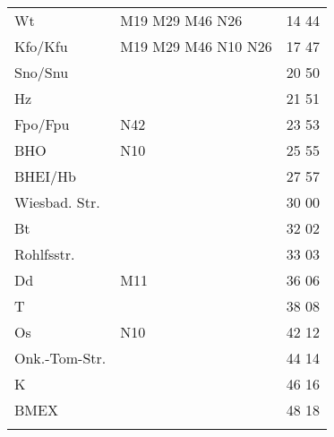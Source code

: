 \begin{tabular}{!{\color{schiefergrau}\vrule width 3pt}*{3}{l!{\color{schiefergrau}\vrule width 3pt}}}
\hline
{}
 \\
\hline
Wt           & \nueins{} \nuzwei{} \mbus{} M19 M29 M46 \nbus{} N26               & 14 44 \\
Kfo/Kfu      & \nueins{} \nuzwei{} \nuneun{} \mbus{} M19 M29 M46 \nbus{} N10 N26 & 17 47 \\
Sno/Snu      & \nuneun{}                                                         & 20 50 \\
Hz           &                                                                   & 21 51 \\
Fpo/Fpu      & \nusieben{} \nbus{} N42                                           & 23 53 \\
BHO          & \nbus{} N10                                                       & 25 55 \\
BHEI/Hb      &                                                                   & 27 57 \\
Wiesbad. Str.&                                                                   & 30 00 \\
Bt           &                                                                   & 32 02 \\
Rohlfsstr.   &                                                                   & 33 03 \\
Dd           & \mbus{} M11                                                       & 36 06 \\
T            &                                                                   & 38 08 \\
Os           & \nbus{} N10                                                       & 42 12 \\
Onk.-Tom-Str.&                                                                   & 44 14 \\
K            &                                                                   & 46 16 \\
BMEX         &                                                                   & 48 18 \\
\myhline
\end{tabular}
%
